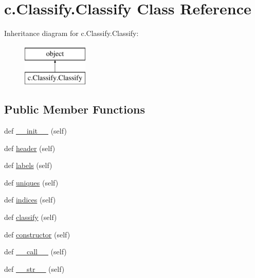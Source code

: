 \hypertarget{classc_1_1_classify_1_1_classify}{}\section{c.\+Classify.\+Classify Class Reference}
\label{classc_1_1_classify_1_1_classify}
Inheritance diagram for c.\+Classify.\+Classify\+:\begin{figure}[H]
\begin{center}
\leavevmode
\includegraphics[height=2.000000cm]{classc_1_1_classify_1_1_classify}
\end{center}
\end{figure}
\subsection*{Public Member Functions}
\begin{DoxyCompactItemize}
\item 
def \hyperlink{classc_1_1_classify_1_1_classify_a398279537ff57bdd2d903fdfa2c398bf}{\+\_\+\+\_\+init\+\_\+\+\_\+} (self)
\item 
def \hyperlink{classc_1_1_classify_1_1_classify_a76c7951d7b300167925e145e58ed3fa3}{header} (self)
\item 
def \hyperlink{classc_1_1_classify_1_1_classify_a5d8e1a6fbcbab785107f9e3a40b7e154}{labels} (self)
\item 
def \hyperlink{classc_1_1_classify_1_1_classify_ace6a8a06833cfe31d3abcbce270817ad}{uniques} (self)
\item 
def \hyperlink{classc_1_1_classify_1_1_classify_a7c4ec3de2e18e3db3a03ddbca71ccba6}{indices} (self)
\item 
def \hyperlink{classc_1_1_classify_1_1_classify_ae0bfdd4ee16c94394efc666b4c501bcc}{classify} (self)
\item 
def \hyperlink{classc_1_1_classify_1_1_classify_ab723602c25ed262d0c38114d6f8da7bc}{constructor} (self)
\item 
def \hyperlink{classc_1_1_classify_1_1_classify_a178781aedac62cb6da8ef6cd71071b12}{\+\_\+\+\_\+call\+\_\+\+\_\+} (self)
\item 
def \hyperlink{classc_1_1_classify_1_1_classify_a45fb26bfae7f894804ed286cac33f379}{\+\_\+\+\_\+str\+\_\+\+\_\+} (self)
\end{DoxyCompactItemize}
